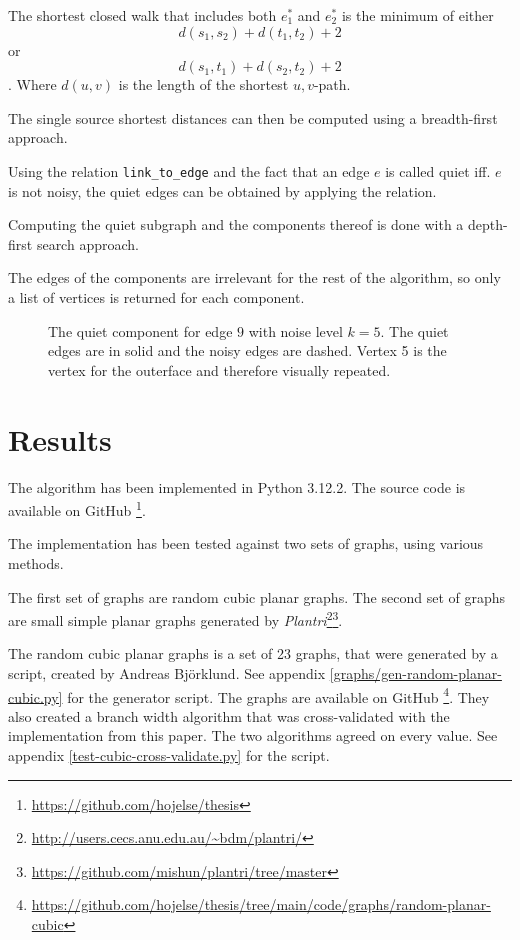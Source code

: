 \documentclass{article}
\begin{document}
			\begin{claim}
				The shortest closed walk that includes both $e_1^*$ and $e_2^*$ is the minimum of either $$d(s_1, s_2) + d(t_1, t_2) + 2$$ or $$d(s_1, t_1) + d(s_2, t_2) + 2$$. Where $d(u, v)$ is the length of the shortest $u,v$-path.
			\end{claim}

			The single source shortest distances can then be computed using a breadth-first approach.

			Using the relation \texttt{link_to_edge} and the fact that an edge $e$ is called quiet iff. $e$ is not noisy, the quiet edges can be obtained by applying the relation.

			Computing the quiet subgraph and the components thereof is done with a depth-first search approach.

			The edges of the components are irrelevant for the rest of the algorithm, so only a list of vertices is returned for each component.


			\begin{figure}[H]
				\centering
				
				\caption{The quiet component for edge $9$ with noise level $k=5$. The quiet edges are in solid and the noisy edges are dashed. Vertex 5 is the vertex for the outerface and therefore visually repeated.}
				\label{fig:quiet}
			\end{figure}

\section{Results}
	The algorithm has been implemented in Python 3.12.2. The source code is available on GitHub \footnote{\url{https://github.com/hojelse/thesis}}.

	The implementation has been tested against two sets of graphs, using various methods.

	The first set of graphs are random cubic planar graphs. The second set of graphs are small simple planar graphs generated by \textit{Plantri}\footnote{\url{http://users.cecs.anu.edu.au/~bdm/plantri/}}\footnote{\url{https://github.com/mishun/plantri/tree/master}}.\cite{BM}

	The random cubic planar graphs is a set of 23 graphs, that were generated by a script, created by Andreas Björklund. See appendix \ref{graphs/gen-random-planar-cubic.py} for the generator script. The graphs are available on GitHub \footnote{\url{https://github.com/hojelse/thesis/tree/main/code/graphs/random-planar-cubic}}. They also created a branch width algorithm that was cross-validated with the implementation from this paper. The two algorithms agreed on every value. See appendix \ref{test-cubic-cross-validate.py} for the script.
\end{document}
